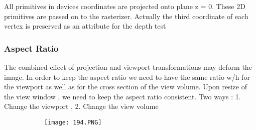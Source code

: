 \documentclass{article}
\begin{document}
All primitives in devices coordinates are projected onto plane z = 0.
These 2D primitives are passed on to the rasterizer.
Actually the third coordinate of each vertex is preserved as an attribute for the depth test 

\subsubsection{Aspect Ratio}

The combined effect of projection and viewport transformations may deform the image.
In order to keep the aspect ratio we need to have the same ratio w/h for the viewport as well as for the cross section of the view volume.
Upon resize of the view window , we need to keep the aspect ratio consistent. Two ways : 1. Change the viewport , 2. Change the view volume

\begin{figure}[ht!]
  \centering
  \begin{subfigure}[b]{0.35\linewidth}
    \texttt{[image: 194.PNG]}
  \end{subfigure}
\end{figure}
\end{document}
